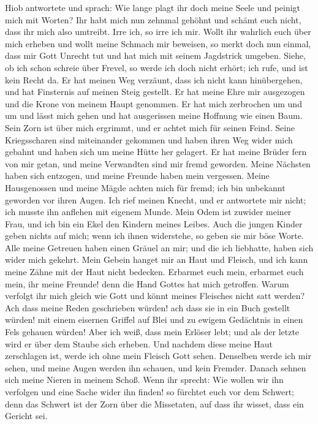  Hiob antwortete und sprach:  Wie lange
plagt ihr doch meine Seele und peinigt mich mit Worten? 
Ihr habt mich nun zehnmal gehöhnt und schämt euch nicht, dass ihr mich
also umtreibt.  Irre ich, so irre ich mir. 
Wollt ihr wahrlich euch über mich erheben und wollt meine Schmach mir
beweisen,  so merkt doch nun einmal, dass mir Gott Unrecht
tut und hat mich mit seinem Jagdstrick umgeben.  Siehe, ob
ich schon schreie über Frevel, so werde ich doch nicht erhört; ich rufe,
und ist kein Recht da.  Er hat meinen Weg verzäunt, dass
ich nicht kann hinübergehen, und hat Finsternis auf meinen Steig
gestellt.  Er hat meine Ehre mir ausgezogen und die Krone
von meinem Haupt genommen.  Er hat mich zerbrochen um und
um und lässt mich gehen und hat ausgerissen meine Hoffnung wie einen
Baum.  Sein Zorn ist über mich ergrimmt, und er achtet
mich für seinen Feind.  Seine Kriegsscharen sind
miteinander gekommen und haben ihren Weg wider mich gebahnt und haben
sich um meine Hütte her gelagert.  Er hat meine Brüder
fern von mir getan, und meine Verwandten sind mir fremd geworden.
 Meine Nächsten haben sich entzogen, und meine Freunde
haben mein vergessen.  Meine Hausgenossen und meine Mägde
achten mich für fremd; ich bin unbekannt geworden vor ihren Augen.
 Ich rief meinen Knecht, und er antwortete mir nicht; ich
musste ihn anflehen mit eigenem Munde.  Mein Odem ist
zuwider meiner Frau, und ich bin ein Ekel den Kindern meines Leibes.
 Auch die jungen Kinder geben nichts auf mich; wenn ich
ihnen widerstehe, so geben sie mir böse Worte.  Alle
meine Getreuen haben einen Gräuel an mir; und die ich liebhatte, haben
sich wider mich gekehrt.  Mein Gebein hanget mir an Haut
und Fleisch, und ich kann meine Zähne mit der Haut nicht bedecken.
 Erbarmet euch mein, erbarmet euch mein, ihr meine
Freunde! denn die Hand Gottes hat mich getroffen.  Warum
verfolgt ihr mich gleich wie Gott und könnt meines Fleisches nicht satt
werden?  Ach dass meine Reden geschrieben würden! ach
dass sie in ein Buch gestellt würden!  mit einem eisernen
Griffel auf Blei und zu ewigem Gedächtnis in einen Fels gehauen würden!
 Aber ich weiß, dass mein Erlöser lebt; und als der
letzte wird er über dem Staube sich erheben.  Und nachdem
diese meine Haut zerschlagen ist, werde ich ohne mein Fleisch Gott
sehen.  Denselben werde ich mir sehen, und meine Augen
werden ihn schauen, und kein Fremder. Danach sehnen sich meine Nieren in
meinem Schoß.  Wenn ihr sprecht: Wie wollen wir ihn
verfolgen und eine Sache wider ihn finden!  so fürchtet
euch vor dem Schwert; denn das Schwert ist der Zorn über die Missetaten,
auf dass ihr wisset, dass ein Gericht sei.

